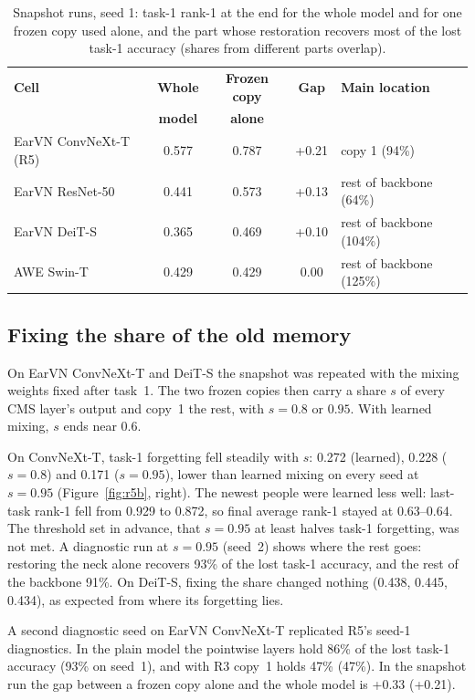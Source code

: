 \documentclass[12pt,a4paper]{report}
\begin{document}
\begin{table}[H]
\centering
\small
\caption{Snapshot runs, seed 1: task-1 rank-1 at the end for the whole model and for one frozen copy used alone, and the part whose restoration recovers most of the lost task-1 accuracy (shares from different parts overlap).}
\label{tab:r5b}
\begin{tabular}{|l|c|c|c|l|}
\hline
\textbf{Cell} & \textbf{Whole} & \textbf{Frozen copy} & \textbf{Gap} & \textbf{Main location} \\
 & \textbf{model} & \textbf{alone} & & \\
\hline
EarVN ConvNeXt-T (R5) & 0.577 & 0.787 & +0.21 & copy 1 (94\%) \\
EarVN ResNet-50 & 0.441 & 0.573 & +0.13 & rest of backbone (64\%) \\
EarVN DeiT-S & 0.365 & 0.469 & +0.10 & rest of backbone (104\%) \\
AWE Swin-T & 0.429 & 0.429 & 0.00 & rest of backbone (125\%) \\
\hline
\end{tabular}
\end{table}

\subsection{Fixing the share of the old memory}
On EarVN ConvNeXt-T and DeiT-S the snapshot was repeated with the mixing weights fixed after task~1. The two frozen copies then carry a share $s$ of every CMS layer's output and copy~1 the rest, with $s = 0.8$ or $0.95$. With learned mixing, $s$ ends near 0.6.

On ConvNeXt-T, task-1 forgetting fell steadily with $s$: 0.272 (learned), 0.228 ($s = 0.8$) and 0.171 ($s = 0.95$), lower than learned mixing on every seed at $s = 0.95$ (Figure~\ref{fig:r5b}, right). The newest people were learned less well: last-task rank-1 fell from 0.929 to 0.872, so final average rank-1 stayed at 0.63--0.64. The threshold set in advance, that $s = 0.95$ at least halves task-1 forgetting, was not met. A diagnostic run at $s = 0.95$ (seed~2) shows where the rest goes: restoring the neck alone recovers 93\% of the lost task-1 accuracy, and the rest of the backbone 91\%. On DeiT-S, fixing the share changed nothing (0.438, 0.445, 0.434), as expected from where its forgetting lies.

A second diagnostic seed on EarVN ConvNeXt-T replicated R5's seed-1 diagnostics. In the plain model the pointwise layers hold 86\% of the lost task-1 accuracy (93\% on seed~1), and with R3 copy~1 holds 47\% (47\%). In the snapshot run the gap between a frozen copy alone and the whole model is +0.33 (+0.21).
\end{document}
